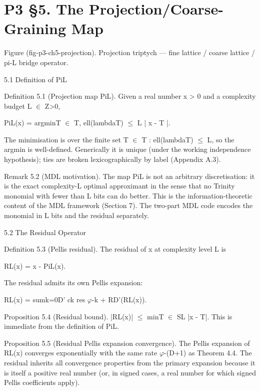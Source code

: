 
\section{P3 §5. The Projection/Coarse-Graining Map}

Figure (fig-p3-ch5-projection). Projection triptych --- fine lattice / coarse lattice / pi-L bridge
                                                  operator.

  5.1 Definition of PiL

        Definition 5.1 (Projection map PiL). Given a real number x > 0 and a
        complexity budget L $\in$ Z>0,

  PiL(x) = argminT $\in$ T, ell(lambdaT) $\leq$ L | x - T |.

  The minimisation is over the finite set {T $\in$ T : ell(lambdaT) $\leq$ L}, so the argmin is
  well-defined. Generically it is unique (under the working independence hypothesis); ties
  are broken lexicographically by label (Appendix A.3).

        Remark 5.2 (MDL motivation). The map PiL is not an arbitrary discretisation: it
        is the exact complexity-L optimal approximant in the sense that no Trinity
        monomial with fewer than L bits can do better. This is the information-theoretic
        content of the MDL framework (Section 7). The two-part MDL code encodes the
        monomial in L bits and the residual separately.

  5.2 The Residual Operator

        Definition 5.3 (Pellis residual). The residual of x at complexity level L is

  RL(x) = x - PiL(x).

  The residual admits its own Pellis expansion:

  RL(x) = sumk=0D' ck res $\varphi$-k + RD'(RL(x)).

        Proposition 5.4 (Residual bound). |RL(x)| $\leq$ minT $\in$ SL |x - T|. This is immediate
        from the definition of PiL.

        Proposition 5.5 (Residual Pellis expansion convergence). The Pellis
        expansion of RL(x) converges exponentially with the same rate $\varphi$-(D+1) as
        Theorem 4.4. The residual inherits all convergence properties from the primary
        expansion because it is itself a positive real number (or, in signed cases, a real
        number for which signed Pellis coefficients apply).

